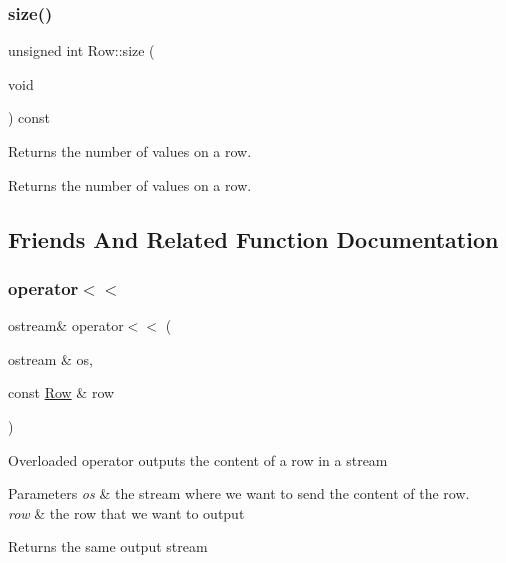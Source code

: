 \subsubsection{\texorpdfstring{size()}{size()}}
{\footnotesize\ttfamily unsigned int Row\+::size (\begin{DoxyParamCaption}\item[{void}]{ }\end{DoxyParamCaption}) const}

Returns the number of values on a row. \begin{DoxyReturn}{Returns}
the number of values on a row. 
\end{DoxyReturn}


\subsection{Friends And Related Function Documentation}
\mbox{\label{class_row_a8962fdc6373687757234a811e803a1da}} 
\subsubsection{\texorpdfstring{operator$<$$<$}{operator<<}\hspace{0.1cm}{\footnotesize\ttfamily [1/2]}}
{\footnotesize\ttfamily ostream\& operator$<$$<$ (\begin{DoxyParamCaption}\item[{ostream \&}]{os,  }\item[{const \mbox{\hyperlink{class_row}{Row}} \&}]{row }\end{DoxyParamCaption})\hspace{0.3cm}{\ttfamily [friend]}}

Overloaded operator outputs the content of a row in a stream 
\begin{DoxyParams}{Parameters}
{\em os} & the stream where we want to send the content of the row. \\
\hline
{\em row} & the row that we want to output \\
\hline
\end{DoxyParams}
\begin{DoxyReturn}{Returns}
the same output stream 
\end{DoxyReturn}
\mbox{\label{class_row_ad4e8b6c4b0238a50bde8e99ec8a0dcb0}} 
